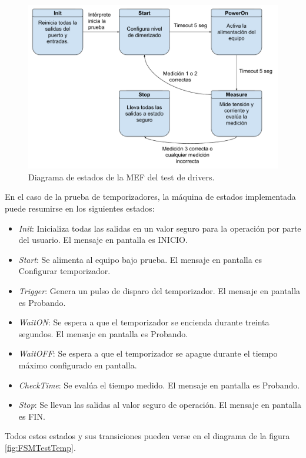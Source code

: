 \begin{figure}[H]
	\centering
	\includegraphics[width=1\textwidth]{./Figures/FSMTestDrivers.pdf}
	\caption{Diagrama de estados de la MEF del test de drivers.}
	\label{fig:FSMTestDrivers}
\end{figure}


En el caso de la prueba de temporizadores, la máquina de estados implementada puede resumirse en los siguientes estados:
\begin{itemize}
	\item \textit{Init}: Inicializa todas las salidas en un valor seguro para la operación por parte del usuario. El mensaje en pantalla es INICIO.
	\item \textit{Start}: Se alimenta al equipo bajo prueba. El mensaje en pantalla es Configurar temporizador.
	\item \textit{Trigger}: Genera un pulso de disparo del temporizador. El mensaje en pantalla es Probando.
	\item \textit{WaitON}: Se espera a que el temporizador se encienda durante treinta segundos. El mensaje en pantalla es Probando.
	\item \textit{WaitOFF}: Se espera a que el temporizador se apague durante el tiempo máximo configurado en pantalla.
	\item \textit{CheckTime}: Se evalúa el tiempo medido. El mensaje en pantalla es Probando.
	\item \textit{Stop}: Se llevan las salidas al valor seguro de operación. El mensaje en pantalla es FIN.
\end{itemize}

Todos estos estados y sus transiciones pueden verse en el diagrama de la figura \ref{fig:FSMTestTemp}.

